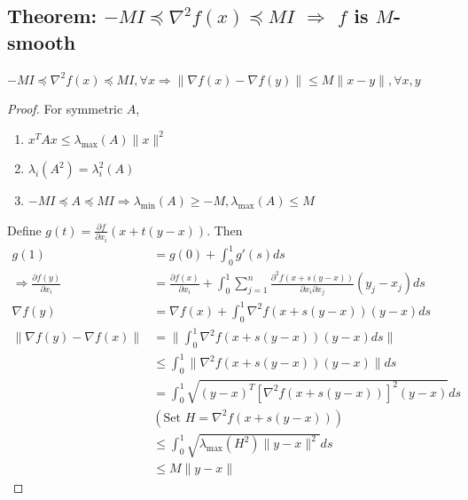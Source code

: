 \documentclass[11pt]{elegantbook}
\begin{document}
\subsection{Theorem: $-MI\preceq\nabla^2 f(x)\preceq  MI$ $\Rightarrow$ $f$ is $M$-smooth}
\begin{theorem}
$-MI\preceq\nabla^2 f(x)\preceq  MI, \forall x \Rightarrow \|\nabla f(x)-\nabla f(y)\|\leq M\|x-y\|,\forall x,y$
\end{theorem}
\begin{proof}
For symmetric $A$,
\begin{enumerate}
    \item $x^TAx\leq \lambda_{\max}(A)\|x\|^2$
    \item $\lambda_{i}(A^2)=\lambda_i^2(A)$
    \item $-MI\preceq A\preceq  MI \Rightarrow \lambda_{\min}(A)\geq-M,\lambda_{\max}(A)\leq M$
\end{enumerate}
Define $g(t)=\frac{\partial f}{\partial x_i}(x+t(y-x))$. Then
\begin{equation}
    \begin{aligned}
        g(1)&=g(0)+\int_0^1g'(s)ds\\
        \Rightarrow	\frac{\partial f(y)}{\partial x_i}&=\frac{\partial f(x)}{\partial x_i}+\int_0^1\sum_{j=1}^n \frac{\partial^2 f(x+s(y-x))}{\partial x_i\partial x_j}(y_j-x_j)ds\\
        \nabla f(y)&=\nabla f(x)+\int_0^1 \nabla^2 f(x+s(y-x))(y-x)ds\\
        \|\nabla f(y)-\nabla f(x)\|&=\|\int_0^1 \nabla^2 f(x+s(y-x))(y-x)ds\|\\
        &\leq \int_0^1\|\nabla^2 f(x+s(y-x))(y-x)\|ds\\
        &=\int_0^1\sqrt{(y-x)^T[\nabla^2 f(x+s(y-x))]^2(y-x)}ds\\
        &(\text{Set }H=\nabla^2 f(x+s(y-x)))\\
        &\leq \int_0^1\sqrt{\lambda_{\max}(H^2)\|y-x\|^2}ds\\
        &\leq M\|y-x\|
    \end{aligned}
    \nonumber
\end{equation}
\end{proof}
\end{document}

